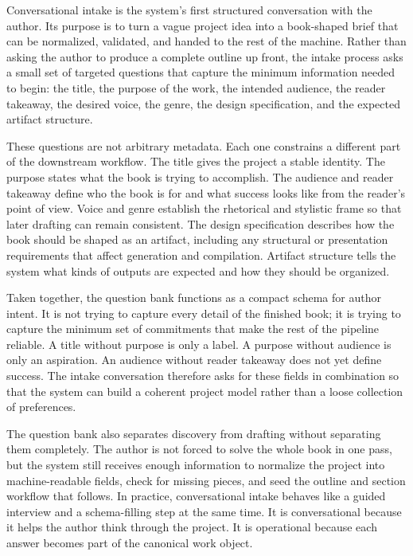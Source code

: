 Conversational intake is the system's first structured conversation with the author. Its purpose is to turn a vague project idea into a book-shaped brief that can be normalized, validated, and handed to the rest of the machine. Rather than asking the author to produce a complete outline up front, the intake process asks a small set of targeted questions that capture the minimum information needed to begin: the title, the purpose of the work, the intended audience, the reader takeaway, the desired voice, the genre, the design specification, and the expected artifact structure.

These questions are not arbitrary metadata. Each one constrains a different part of the downstream workflow. The title gives the project a stable identity. The purpose states what the book is trying to accomplish. The audience and reader takeaway define who the book is for and what success looks like from the reader's point of view. Voice and genre establish the rhetorical and stylistic frame so that later drafting can remain consistent. The design specification describes how the book should be shaped as an artifact, including any structural or presentation requirements that affect generation and compilation. Artifact structure tells the system what kinds of outputs are expected and how they should be organized.

Taken together, the question bank functions as a compact schema for author intent. It is not trying to capture every detail of the finished book; it is trying to capture the minimum set of commitments that make the rest of the pipeline reliable. A title without purpose is only a label. A purpose without audience is only an aspiration. An audience without reader takeaway does not yet define success. The intake conversation therefore asks for these fields in combination so that the system can build a coherent project model rather than a loose collection of preferences.

The question bank also separates discovery from drafting without separating them completely. The author is not forced to solve the whole book in one pass, but the system still receives enough information to normalize the project into machine-readable fields, check for missing pieces, and seed the outline and section workflow that follows. In practice, conversational intake behaves like a guided interview and a schema-filling step at the same time. It is conversational because it helps the author think through the project. It is operational because each answer becomes part of the canonical work object.

